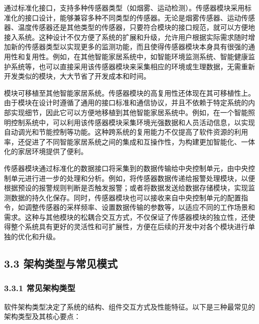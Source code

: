 
通过标准化接口，支持多种传感器类型（如烟雾、运动检测）。传感器模块采用标准化的接口设计，能够兼容多种不同类型的传感器。无论是烟雾传感器、运动传感器、温度传感器还是其他类型的传感器，只要符合模块的接口规范，就可以方便地接入系统。这种设计不仅方便了系统的扩展和升级，允许用户根据实际需求随时增加新的传感器类型以实现更多的监测功能，而且使得传感器模块本身具有很强的通用性和复用性。例如，在其他智能家居系统中，如智能环境监测系统、智能健康监护系统等，也可以直接采用该传感器模块来采集相应的环境或生理数据，无需重新开发类似的模块，大大节省了开发成本和时间。

模块可移植至其他智能家居系统。传感器模块的高复用性还体现在其可移植性上。由于模块在设计时遵循了通用的接口标准和通信协议，并且不依赖于特定系统的内部实现细节，因此它可以方便地移植到其他智能家居系统中。例如，在一个智能照明控制系统中，可以利用该传感器模块采集环境光强数据和人员活动信息，以实现自动调光和节能控制等功能。这种跨系统的复用能力不仅提高了软件资源的利用率，还促进了不同智能家居系统之间的集成和互操作性，为构建更加智能化、一体化的家居环境提供了便利。


传感器模块通过标准化的数据接口将采集到的数据传输给中央控制单元，由中央控制单元进行进一步的处理和分析。例如，将传感器数据传递给报警处理模块，以便根据预设的报警规则判断是否触发报警；或者将数据发送给数据存储模块，实现监测数据的持久化保存。同时，传感器模块也可以接收来自中央控制单元的配置指令，如调整传感器的采样频率、设置数据传输的参数等，以适应不同的工作场景和需求。这种与其他模块的松耦合交互方式，不仅保证了传感器模块的独立性，还使得整个系统具有更好的灵活性和可扩展性，方便在后续的开发中对各个模块进行单独的优化和升级。

\hypertarget{ux67b6ux6784ux7c7bux578bux4e0eux5e38ux89c1ux6a21ux5f0f}{%
\subsection{3.3 架构类型与常见模式}\label{ux67b6ux6784ux7c7bux578bux4e0eux5e38ux89c1ux6a21ux5f0f}}

\hypertarget{ux5e38ux89c1ux67b6ux6784ux7c7bux578b}{%
\subsubsection{3.3.1 常见架构类型}\label{ux5e38ux89c1ux67b6ux6784ux7c7bux578b}}

软件架构类型决定了系统的结构、组件交互方式及性能特征。以下是三种最常见的架构类型及其核心要点：

